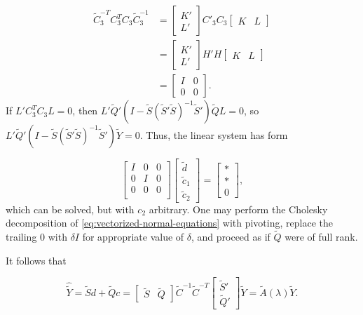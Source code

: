 \documentclass[12pt]{article}
\newcommand{\tildeS}{\tilde{S}}
\newcommand{\tildeY}{\tilde{Y}}
\newcommand{\tildeQ}{\tilde{Q}}
\newcommand{\tildeA}{\tilde{A}}
\theoremstyle{definition}
\begin{document}
\begin{align*}
\tilde{C}_3^{-T} C_3^{T} C_3 \tilde{C}_3^{-1} &= \begin{bmatrix} K' \\ L' \end{bmatrix} C'_3C_3 \begin{bmatrix} K &  L\end{bmatrix} \\
&= \begin{bmatrix} K' \\ L' \end{bmatrix} H'H \begin{bmatrix} K &  L\end{bmatrix} \\
&= \begin{bmatrix} I & 0 \\ 0 & 0 \end{bmatrix}.
\end{align*}
\noindent
If $L'C_3^{T} C_3 L = 0$, then $L'\tildeQ'\left( I - \tildeS\left( \tildeS' \tildeS \right)^{-1} \tildeS' \right)\tildeQ L = 0$, so $L'\tildeQ'\left( I - \tildeS\left( \tildeS' \tildeS \right)^{-1} \tildeS' \right) \tildeY = 0$. Thus, the linear system has form

\begin{equation} \label{eq:vectorized-normal-equations-cholesky-2}
\begin{bmatrix}
I & 0 & 0\\
0 & I & 0 \\
0 & 0 & 0 \\
\end{bmatrix}
\begin{bmatrix}
\tilde{d}\\
\tilde{c}_1\\
\tilde{c}_2
\end{bmatrix}
= \begin{bmatrix}
* \\
* \\
0
\end{bmatrix},
\end{equation}
\noindent
which can be solved, but with $c_2$ arbitrary. One may perform the Cholesky decomposition of \ref{eq:vectorized-normal-equations} with pivoting, replace the trailing $0$ with $\delta I$ for appropriate value of $\delta$, and proceed as if $\tildeQ$ were of full rank. 
\bigskip

It follows that

\begin{equation} \label{eq:cholesky-smoothing-matrix}
\widehat{\tildeY} = \tildeS d + \tildeQ c = \begin{bmatrix} \tildeS & \tildeQ \end{bmatrix} \tilde{C}^{-1} \tilde{C}^{-T} \begin{bmatrix} \tildeS' \\ \tildeQ' \end{bmatrix} \tildeY = \tildeA\left(\lambda\right) \tildeY.
\end{equation}
\end{document}
